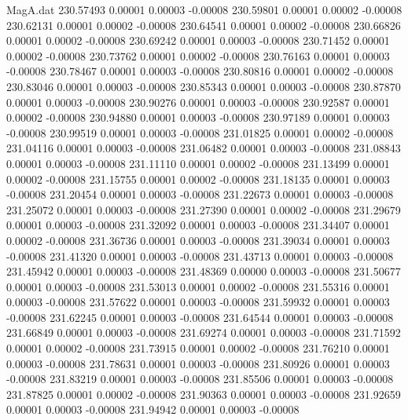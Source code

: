 \begin{filecontents}{MagA.dat}
 230.57493    0.00001    0.00003   -0.00008
 230.59801    0.00001    0.00002   -0.00008
 230.62131    0.00001    0.00002   -0.00008
 230.64541    0.00001    0.00002   -0.00008
 230.66826    0.00001    0.00002   -0.00008
 230.69242    0.00001    0.00003   -0.00008
 230.71452    0.00001    0.00002   -0.00008
 230.73762    0.00001    0.00002   -0.00008
 230.76163    0.00001    0.00003   -0.00008
 230.78467    0.00001    0.00003   -0.00008
 230.80816    0.00001    0.00002   -0.00008
 230.83046    0.00001    0.00003   -0.00008
 230.85343    0.00001    0.00003   -0.00008
 230.87870    0.00001    0.00003   -0.00008
 230.90276    0.00001    0.00003   -0.00008
 230.92587    0.00001    0.00002   -0.00008
 230.94880    0.00001    0.00003   -0.00008
 230.97189    0.00001    0.00003   -0.00008
 230.99519    0.00001    0.00003   -0.00008
 231.01825    0.00001    0.00002   -0.00008
 231.04116    0.00001    0.00003   -0.00008
 231.06482    0.00001    0.00003   -0.00008
 231.08843    0.00001    0.00003   -0.00008
 231.11110    0.00001    0.00002   -0.00008
 231.13499    0.00001    0.00002   -0.00008
 231.15755    0.00001    0.00002   -0.00008
 231.18135    0.00001    0.00003   -0.00008
 231.20454    0.00001    0.00003   -0.00008
 231.22673    0.00001    0.00003   -0.00008
 231.25072    0.00001    0.00003   -0.00008
 231.27390    0.00001    0.00002   -0.00008
 231.29679    0.00001    0.00003   -0.00008
 231.32092    0.00001    0.00003   -0.00008
 231.34407    0.00001    0.00002   -0.00008
 231.36736    0.00001    0.00003   -0.00008
 231.39034    0.00001    0.00003   -0.00008
 231.41320    0.00001    0.00003   -0.00008
 231.43713    0.00001    0.00003   -0.00008
 231.45942    0.00001    0.00003   -0.00008
 231.48369    0.00000    0.00003   -0.00008
 231.50677    0.00001    0.00003   -0.00008
 231.53013    0.00001    0.00002   -0.00008
 231.55316    0.00001    0.00003   -0.00008
 231.57622    0.00001    0.00003   -0.00008
 231.59932    0.00001    0.00003   -0.00008
 231.62245    0.00001    0.00003   -0.00008
 231.64544    0.00001    0.00003   -0.00008
 231.66849    0.00001    0.00003   -0.00008
 231.69274    0.00001    0.00003   -0.00008
 231.71592    0.00001    0.00002   -0.00008
 231.73915    0.00001    0.00002   -0.00008
 231.76210    0.00001    0.00003   -0.00008
 231.78631    0.00001    0.00003   -0.00008
 231.80926    0.00001    0.00003   -0.00008
 231.83219    0.00001    0.00003   -0.00008
 231.85506    0.00001    0.00003   -0.00008
 231.87825    0.00001    0.00002   -0.00008
 231.90363    0.00001    0.00003   -0.00008
 231.92659    0.00001    0.00003   -0.00008
 231.94942    0.00001    0.00003   -0.00008

\end{filecontents}

